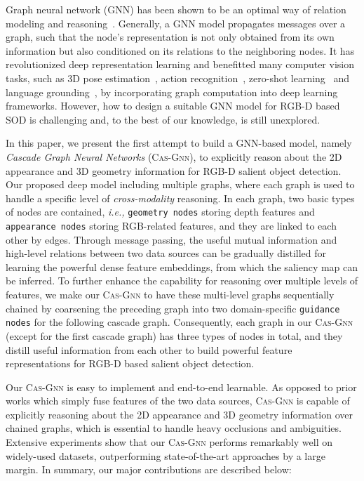 \documentclass[runningheads]{llncs}
\begin{document}
Graph neural network ({{GNN}}) has been shown to be an optimal way of relation modeling and reasoning~\cite{Shen_2018_ECCV,Chen_2019_CVPR,Zhao_2019_CVPR1,xu2018powerful,Wang_2019_ICCV}. Generally, a GNN model propagates messages over a graph, such that the node's representation is not only obtained from its own information but also conditioned on its relations to the neighboring nodes. It has revolutionized deep representation learning and benefitted many computer vision tasks, such as 3D pose estimation~\cite{Cai_2019_ICCV}, action recognition~\cite{Zhao_2019_ICCV_graph}, zero-shot learning~\cite{xie2020} and language grounding~\cite{Bajaj_2019_ICCV}, by incorporating graph computation into deep learning frameworks. However, how to design a suitable GNN model for RGB-D based SOD is challenging and, to the best of our knowledge, is still unexplored.	

In this paper, we present the first attempt to build a GNN-based model, namely {\em Cascade Graph Neural Networks} ({\scshape{Cas-Gnn}}), to explicitly reason about the 2D appearance and 3D geometry information for RGB-D salient object detection. Our proposed deep model including multiple graphs, where each graph is used to handle a specific level of \emph{cross-modality} reasoning.  In each graph, two basic types of nodes are contained, \emph{i.e.,} {\tt geometry nodes} storing depth features and  {\tt appearance nodes} storing RGB-related features, and they are linked to each other by edges. Through message passing, the useful mutual information and high-level relations between two data sources can be gradually distilled for learning the powerful dense feature embeddings, from which the saliency map can be inferred. To further enhance the capability for reasoning over multiple levels of features, we make our {\scshape{Cas-Gnn}} to have these multi-level graphs sequentially chained by coarsening the preceding graph into two domain-specific {\tt guidance nodes} for the following cascade graph. Consequently, each graph in our {\scshape{Cas-Gnn}} (except for the first cascade graph) has three types of nodes in total, and they distill useful information from each other to build powerful feature representations for RGB-D based salient object detection. 

Our {\scshape{Cas-Gnn}} is easy to implement and end-to-end learnable.  As opposed to prior works which simply fuse features of the two data sources, {\scshape{Cas-Gnn}} is capable of explicitly reasoning about the 2D appearance and 3D geometry information over chained graphs, which is essential to handle heavy occlusions and ambiguities. Extensive experiments show that our {\scshape{Cas-Gnn}} performs remarkably well on  widely-used datasets, outperforming state-of-the-art approaches by a large margin. In summary, our major contributions are described below:
\end{document}
